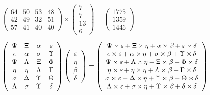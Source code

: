 \documentclass[12pt]{article}
\begin{document}
 
 
\noindent{}
 
 

 
$\left( \begin{array}{ccccccccccccccc}
          64  & 
          50  & 
          53  & 
          48  \\ 
          42  & 
          49  & 
          32  & 
          51  \\ 
          57  & 
          41  & 
          40  & 
          40
\end{array}\right) \times
\left( \begin{array}{c}
           7  \\ 
           7  \\ 
          13  \\ 
           6
\end{array}\right)  =
\left( \begin{array}{c}
        1775  \\ 
        1359  \\ 
        1446
\end{array}\right)  $
 
$  %
 \left( \begin{array}
 {
 c
 c
 c
 c
 }
 \Psi & 
                    \Xi & 
 \alpha & 
 \varepsilon \\ 
 \epsilon & 
 \alpha & 
 \sigma & 
 \Upsilon \\ 
 \Psi & 
 \Lambda & 
                    \Xi & 
 \Phi \\ 
 \eta & 
 \eta & 
 \Lambda & 
 \Gamma \\ 
 \sigma & 
 \Delta & 
 \Upsilon & 
 \Theta \\ 
 \Lambda & 
 \sigma & 
 \Upsilon & 
 \delta
 \end{array} \right)
 \left( \begin{array}
 {
 c
 }
 \varepsilon \\ 
 \eta \\ 
 \beta \\ 
 \delta
 \end{array} \right)
=
 \left( \begin{array}
 {
 c
 }
  \Psi \times  \varepsilon +                     \Xi \times  \eta +  \alpha \times  \beta +  \varepsilon \times  \delta \\ 
  \epsilon \times  \varepsilon +  \alpha \times  \eta +  \sigma \times  \beta +  \Upsilon \times  \delta \\ 
  \Psi \times  \varepsilon +  \Lambda \times  \eta +                     \Xi \times  \beta +  \Phi \times  \delta \\ 
  \eta \times  \varepsilon +  \eta \times  \eta +  \Lambda \times  \beta +  \Gamma \times  \delta \\ 
  \sigma \times  \varepsilon +  \Delta \times  \eta +  \Upsilon \times  \beta +  \Theta \times  \delta \\ 
  \Lambda \times  \varepsilon +  \sigma \times  \eta +  \Upsilon \times  \beta +  \delta \times  \delta
 \end{array} \right)
$
 
\end{document}
